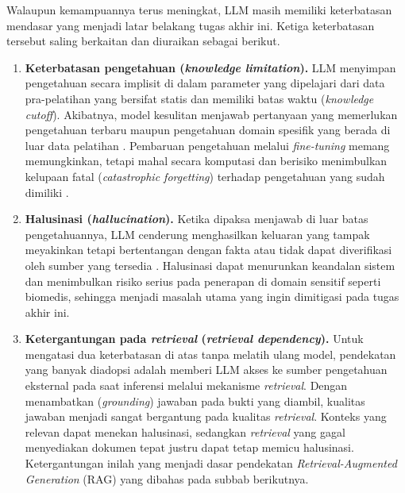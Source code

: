 Walaupun kemampuannya terus meningkat, LLM masih memiliki keterbatasan mendasar yang menjadi latar belakang tugas akhir ini. Ketiga keterbatasan tersebut saling berkaitan dan diuraikan sebagai berikut.

\begin{enumerate}[1.]
\item \textbf{Keterbatasan pengetahuan (\textit{knowledge limitation}).} LLM menyimpan pengetahuan secara implisit di dalam parameter yang dipelajari dari data pra-pelatihan yang bersifat statis dan memiliki batas waktu (\textit{knowledge cutoff}). Akibatnya, model kesulitan menjawab pertanyaan yang memerlukan pengetahuan terbaru maupun pengetahuan domain spesifik yang berada di luar data pelatihan \parencite{zhao2023survey}. Pembaruan pengetahuan melalui \textit{fine-tuning} memang memungkinkan, tetapi mahal secara komputasi dan berisiko menimbulkan kelupaan fatal (\textit{catastrophic forgetting}) terhadap pengetahuan yang sudah dimiliki \parencite{zhao2023survey}.

\item \textbf{Halusinasi (\textit{hallucination}).} Ketika dipaksa menjawab di luar batas pengetahuannya, LLM cenderung menghasilkan keluaran yang tampak meyakinkan tetapi bertentangan dengan fakta atau tidak dapat diverifikasi oleh sumber yang tersedia \parencite{zhao2023survey}. Halusinasi dapat menurunkan keandalan sistem dan menimbulkan risiko serius pada penerapan di domain sensitif seperti biomedis, sehingga menjadi masalah utama yang ingin dimitigasi pada tugas akhir ini.

\item \textbf{Ketergantungan pada \textit{retrieval} (\textit{retrieval dependency}).} Untuk mengatasi dua keterbatasan di atas tanpa melatih ulang model, pendekatan yang banyak diadopsi adalah memberi LLM akses ke sumber pengetahuan eksternal pada saat inferensi melalui mekanisme \textit{retrieval}. Dengan menambatkan (\textit{grounding}) jawaban pada bukti yang diambil, kualitas jawaban menjadi sangat bergantung pada kualitas \textit{retrieval}. Konteks yang relevan dapat menekan halusinasi, sedangkan \textit{retrieval} yang gagal menyediakan dokumen tepat justru dapat tetap memicu halusinasi. Ketergantungan inilah yang menjadi dasar pendekatan \textit{Retrieval-Augmented Generation} (RAG) yang dibahas pada subbab berikutnya.
\end{enumerate}

